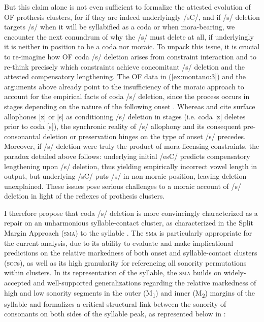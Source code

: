\documentclass[output=paper,colorlinks,citecolor=brown,
]{langscibook}
\begin{document}
But this claim alone is not even sufficient to formalize the attested evolution of OF prothesis clusters, for if they are indeed underlyingly /sC/, and if /s/ deletion targets /s/ when it will be syllabified as a coda or when mora-bearing, we encounter the next conundrum of why the /s/ must delete at all, if underlyingly it is neither in position to be a coda nor moraic.  To unpack this issue, it is crucial to re-imagine how OF coda /s/ deletion arises from constraint interaction and to re-think precisely which constraints achieve concomitant /s/ deletion and the attested compensatory lengthening.  The OF data in (\ref{ex:montano:3}) and the arguments above already point to the insufficiency of the moraic approach to account for the empirical facts of coda /s/ deletion, since the process occurs in stages depending on the nature of the following onset \citep{Montaño2017}.  Whereas \citet{Pope1952} and \citet{Gess1998, Gess1999} cite surface allophones [z] or [s] as conditioning /s/ deletion in stages (i.e. coda [z] deletes prior to coda [s]), the synchronic reality of /s/ allophony and its consequent pre-consonantal deletion or preservation hinges on the type of onset /s/ precedes.  Moreover, if /s/ deletion were truly the product of mora-licensing constraints, the paradox detailed above follows: underlying initial /esC/ predicts compensatory lengthening upon /s/ deletion, thus yielding empirically incorrect vowel length in output, but underlying /sC/ puts /s/ in non-moraic position, leaving deletion unexplained.  These issues pose serious challenges to a moraic account of /s/ deletion in light of the reflexes of prothesis clusters.

I therefore propose that coda /s/ deletion is more convincingly characterized as a repair on an unharmonious syllable-contact cluster, as characterized in the Split Margin Approach (\textsc{sma}) to the syllable \citep{baertschdavis2003, BaertschDavis2009, GreenBaertsch2014}.  The \textsc{sma} is particularly appropriate for the current analysis, due to its ability to evaluate and make implicational predictions on the relative markedness of both onset and syllable-contact clusters (\textsc{scc}s), as well as its high granularity for referencing all sonority permutations within clusters.  In its representation of the syllable, the \textsc{sma} builds on widely-accepted and well-supported generalizations regarding the relative markedness of high and low sonority segments in the outer (M\textsubscript{1}) and inner (M\textsubscript{2}) margins of the syllable and formalizes a critical structural link between the sonority of consonants on both sides of the syllable peak, as represented below in : 
\end{document}
